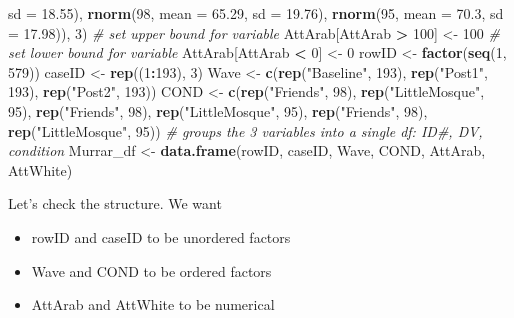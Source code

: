 \documentclass[
  11pt,
]{book}
\newenvironment{Shaded}{\begin{snugshade}}{\end{snugshade}}
\newcommand{\AttributeTok}[1]{\textcolor[rgb]{0.27,0.27,0.27}{#1}}
\newcommand{\CommentTok}[1]{\textcolor[rgb]{0.37,0.37,0.37}{\textit{#1}}}
\newcommand{\DecValTok}[1]{\textcolor[rgb]{0.06,0.06,0.06}{#1}}
\newcommand{\FloatTok}[1]{\textcolor[rgb]{0.06,0.06,0.06}{#1}}
\newcommand{\FunctionTok}[1]{\textcolor[rgb]{0.27,0.27,0.27}{\textbf{#1}}}
\newcommand{\NormalTok}[1]{#1}
\newcommand{\OtherTok}[1]{\textcolor[rgb]{0.37,0.37,0.37}{#1}}
\newcommand{\SpecialCharTok}[1]{\textcolor[rgb]{0.43,0.43,0.43}{\textbf{#1}}}
\newcommand{\StringTok}[1]{\textcolor[rgb]{0.5,0.5,0.5}{#1}}
\providecommand{\tightlist}{%
  \setlength{\itemsep}{0pt}\setlength{\parskip}{0pt}}
\begin{document}
\begin{Shaded}
\begin{Highlighting}[]
    \AttributeTok{sd =} \FloatTok{18.55}\NormalTok{), }\FunctionTok{rnorm}\NormalTok{(}\DecValTok{98}\NormalTok{, }\AttributeTok{mean =} \FloatTok{65.29}\NormalTok{, }\AttributeTok{sd =} \FloatTok{19.76}\NormalTok{), }\FunctionTok{rnorm}\NormalTok{(}\DecValTok{95}\NormalTok{, }\AttributeTok{mean =} \FloatTok{70.3}\NormalTok{,}
    \AttributeTok{sd =} \FloatTok{17.98}\NormalTok{)), }\DecValTok{3}\NormalTok{)}
\CommentTok{\# set upper bound for variable}
\NormalTok{AttArab[AttArab }\SpecialCharTok{\textgreater{}} \DecValTok{100}\NormalTok{] }\OtherTok{\textless{}{-}} \DecValTok{100}
\CommentTok{\# set lower bound for variable}
\NormalTok{AttArab[AttArab }\SpecialCharTok{\textless{}} \DecValTok{0}\NormalTok{] }\OtherTok{\textless{}{-}} \DecValTok{0}
\NormalTok{rowID }\OtherTok{\textless{}{-}} \FunctionTok{factor}\NormalTok{(}\FunctionTok{seq}\NormalTok{(}\DecValTok{1}\NormalTok{, }\DecValTok{579}\NormalTok{))}
\NormalTok{caseID }\OtherTok{\textless{}{-}} \FunctionTok{rep}\NormalTok{((}\DecValTok{1}\SpecialCharTok{:}\DecValTok{193}\NormalTok{), }\DecValTok{3}\NormalTok{)}
\NormalTok{Wave }\OtherTok{\textless{}{-}} \FunctionTok{c}\NormalTok{(}\FunctionTok{rep}\NormalTok{(}\StringTok{"Baseline"}\NormalTok{, }\DecValTok{193}\NormalTok{), }\FunctionTok{rep}\NormalTok{(}\StringTok{"Post1"}\NormalTok{, }\DecValTok{193}\NormalTok{), }\FunctionTok{rep}\NormalTok{(}\StringTok{"Post2"}\NormalTok{, }\DecValTok{193}\NormalTok{))}
\NormalTok{COND }\OtherTok{\textless{}{-}} \FunctionTok{c}\NormalTok{(}\FunctionTok{rep}\NormalTok{(}\StringTok{"Friends"}\NormalTok{, }\DecValTok{98}\NormalTok{), }\FunctionTok{rep}\NormalTok{(}\StringTok{"LittleMosque"}\NormalTok{, }\DecValTok{95}\NormalTok{), }\FunctionTok{rep}\NormalTok{(}\StringTok{"Friends"}\NormalTok{, }\DecValTok{98}\NormalTok{),}
    \FunctionTok{rep}\NormalTok{(}\StringTok{"LittleMosque"}\NormalTok{, }\DecValTok{95}\NormalTok{), }\FunctionTok{rep}\NormalTok{(}\StringTok{"Friends"}\NormalTok{, }\DecValTok{98}\NormalTok{), }\FunctionTok{rep}\NormalTok{(}\StringTok{"LittleMosque"}\NormalTok{, }\DecValTok{95}\NormalTok{))}
\CommentTok{\# groups the 3 variables into a single df: ID\#, DV, condition}
\NormalTok{Murrar\_df }\OtherTok{\textless{}{-}} \FunctionTok{data.frame}\NormalTok{(rowID, caseID, Wave, COND, AttArab, AttWhite)}
\end{Highlighting}
\end{Shaded}

Let's check the structure. We want

\begin{itemize}
\tightlist
\item
  rowID and caseID to be unordered factors
\item
  Wave and COND to be ordered factors
\item
  AttArab and AttWhite to be numerical
\end{itemize}
\end{document}
